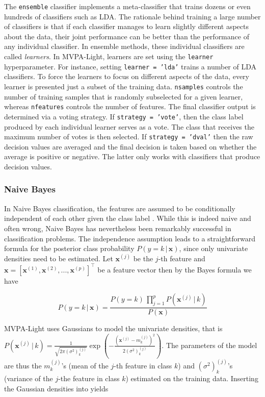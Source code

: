 \documentclass[utf8]{frontiersSCNS} %
\newcommand{\mf}[2]{m_#1^{(#2)}}
\newcommand{\sig}[2]{(\sigma^2)_#1^{(#2)}}
\newcommand{\x}{\mathbf{x}}
\newcommand{\xf}[1]{\mathbf{x}^{(#1)}} %
\newcommand{\ttt}[1]{\texttt{#1}}
\begin{document}
The \ttt{ensemble} classifier implements a meta-classifier that trains dozens
or even hundreds of classifiers such as LDA. The rationale behind training a large number of classifiers is that if each classifier manages to learn slightly different aspects about the data, their joint performance can be better than the performance of any individual classifier.
In ensemble methods, these individual classifiers are called \textit{learners}. In MVPA-Light, learners are set using the \ttt{learner} hyperparameter. For instance, setting \ttt{learner = 'lda'} trains a number of LDA classifiers. To force the learners to focus on different aspects of the data, every learner is presented just a subset of the training data. \ttt{nsamples} controls the number of training samples that is randomly subselected for a given learner, whereas \ttt{nfeatures} controls the number of features.
The final classifier output is determined via a voting strategy. If \ttt{strategy = 'vote'}, then the class label produced by each individual learner serves as a vote. The class that receives the maximum number of votes is then selected. If \ttt{strategy = 'dval'}  then the raw decision values are averaged and the final decision is taken based on whether the average is positive or negative. The latter only works with classifiers that produce decision values.

\subsubsection{Naive Bayes}

In Naive Bayes classification, the features are assumed to be conditionally independent of each other given the class label \citep{Bishop2007}. While this is indeed naive and often wrong, Naive Bayes has nevertheless been remarkably successful in classification problems. The independence assumption leads to a straightforward formula for the posterior class probability $P(y = k\,|\,\x)$, since only univariate densities need to be estimated. Let $\xf{j}$ be the $j$-th feature and $\x = [\xf{1}, \xf{2}, ..., \xf{p}]^\top$ be a feature vector then by the Bayes formula we have

\begin{equation}
\label{eq:naive_bayes}
P(y = k\,|\,\x) = \frac{P(y = k)\,\prod_{j=1}^p P(\xf{j}\,|\,k)}{P(\x)}
\end{equation}

MVPA-Light uses Gaussians to model the univariate densities, that is $P(\xf{j}\,|\,k) = \frac{1}{\sqrt{2\pi\sig{k}{j}}} \exp(-\frac{(\xf{j} - \mf{k}{j})^2}{2\sig{k}{j}})$. The parameters of the model are thus the $\mf{k}{j}$'s (mean of the $j$-th feature in class $k$) and $\sig{k}{j}$'s (variance of the $j$-the feature in class $k$) estimated on the training data. Inserting the Gaussian densities into  yields
\end{document}

